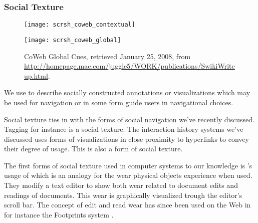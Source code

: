 \subsubsection{Social Texture}

\begin{figure}
  \captionstyle{\raggedright}
  \begin{whole}
    \begin{minipage}[t]{0.475\wholewidth}
      \texttt{[image: scrsh\_coweb\_contextual]}
      \caption[CoWeb Contextual Cues]{%
        CoWeb Contextual Cues,
        retrieved January 25, 2008, from
        \url{http://homepage.mac.com/juggle5/WORK/publications/SwikiWriteup.html}.
      }
      \label{figure:scrsh.coweb.contextual}
    \end{minipage}
    \hfill
    \begin{minipage}[t]{0.475\wholewidth}
      \texttt{[image: scrsh\_coweb\_global]}
      \caption[CoWeb Global Cues]{%
        CoWeb Global Cues,
        retrieved January 25, 2008, from
        \url{http://homepage.mac.com/juggle5/WORK/publications/SwikiWriteup.html}.
      }
      \label{figure:scrsh.coweb.global}
    \end{minipage}
  \end{whole}
  \normalcaption
\end{figure}

We use  to describe socially constructed annotations or
visualizations which may be used for navigation or in some form guide
users in navigational choices.

Social texture ties in with the forms of social navigation we've
recently discussed. Tagging for instance is a social texture.
The interaction history systems we've discussed uses forms of visualizations
in close proximity to hyperlinks to convey their degree of usage. This is also
a form of social texture.

The first forms of social texture used in computer systems to our knowledge is
\citet{hill92}'s usage of  which is an analogy for
the wear physical objects experience when used. They modify a text editor to
show both wear related to document edits and readings of documents. This wear
is graphically visualized trough the editor's scroll bar.
The concept of edit and read wear has since been used on the Web in for
instance the Footprints system \citep{wexelblat99}.

